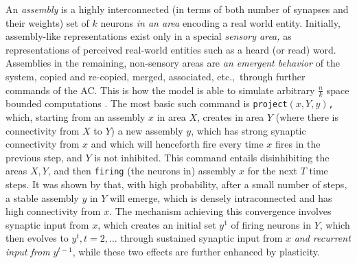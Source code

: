\documentclass[final,12pt]{colt2022} %
\begin{document}
An {\em assembly} is a highly interconnected (in terms of both number of synapses and their weights) set of $k$ neurons {\em in an area} encoding a real world entity. Initially, assembly-like representations exist only in a special {\em sensory area,} as representations of perceived real-world entities such as a heard (or read) word. Assemblies in the remaining, non-sensory areas are {\em an emergent behavior} of the system, copied and re-copied, merged, associated, etc.,~through further commands of the AC.  This is how the model is able to simulate arbitrary $\frac{n}{k}$ space bounded computations \citep{papadimitriou2020brain}. The most basic such command is {\tt project$(x,Y,y)$,} which, starting from an assembly $x$ in area $X$, creates in area $Y$ (where there is connectivity from $X$ to $Y$) a new assembly $y$, which has strong synaptic connectivity from $x$ and which will henceforth fire every time $x$ fires in the previous step, and $Y$ is not inhibited.  This command entails disinhibiting the areas $X,Y$, and then {\tt firing} (the neurons in) assembly $x$ for the next $T$ time steps.  It was shown by \citet{papadimitriou2019random} that, with high probability, after a small number of steps, a stable assembly $y$ in $Y$ will emerge, which is densely intraconnected and has high connectivity from $x$. The mechanism achieving this convergence involves synaptic input from $x$, which creates an initial set $y^1$ of firing neurons in $Y$, which then evolves to $y^t, t=2,\ldots$ through sustained synaptic input from $x$ {\em and recurrent input from $y^{t-1}$}, while these two effects are further enhanced by plasticity.  
\end{document}
